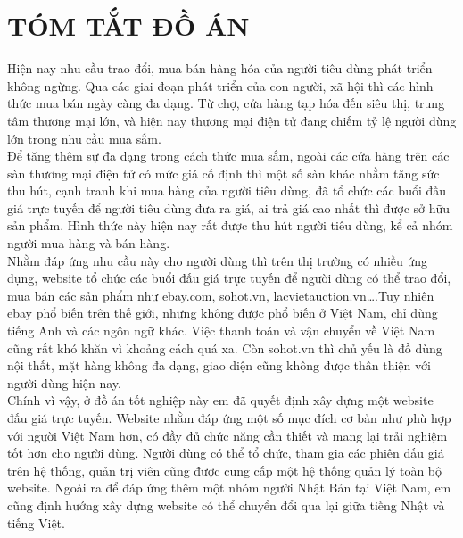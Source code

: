 \documentclass{article}
\renewcommand{\figurename}{\fontsize{12pt}{0pt}\selectfont \bfseries Hình}
\begin{document}
\section*{TÓM TẮT ĐỒ ÁN}
\thispagestyle{empty}
Hiện nay nhu cầu trao đổi, mua bán hàng hóa của người tiêu dùng phát triển không ngừng. Qua các giai đoạn phát triển của con người, xã hội thì các hình thức mua bán ngày càng đa dạng. Từ chợ, cửa hàng tạp hóa đến siêu thị, trung tâm thương mại lớn, và hiện nay thương mại điện tử đang chiếm tỷ lệ người dùng lớn trong nhu cầu mua sắm. \\
Để tăng thêm sự đa dạng trong cách thức mua sắm, ngoài các cửa hàng trên các sàn thương mại điện tử có mức giá cố định thì một số sàn khác nhằm tăng sức thu hút, cạnh tranh khi mua hàng của người tiêu dùng, đã tổ chức các buổi đấu giá trực tuyến để người tiêu dùng đưa ra giá, ai trả giá cao nhất thì được sở hữu sản phẩm. Hình thức này hiện nay rất được thu hút người tiêu dùng, kể cả nhóm người mua hàng và bán hàng.\\
Nhằm đáp ứng nhu cầu này cho người dùng thì trên thị trường có nhiều ứng dụng, website tổ chức các buổi đấu giá trực tuyến để người dùng có thể trao đổi, mua bán các sản phẩm như ebay.com, sohot.vn, lacvietauction.vn….Tuy nhiên ebay phổ biến trên thế giới, nhưng không được phổ biến ở Việt Nam, chỉ dùng tiếng Anh và các ngôn ngữ khác. Việc thanh toán và vận chuyển về Việt Nam cũng rất khó khăn vì khoảng cách quá xa. Còn sohot.vn thì chủ yếu là đồ dùng nội thất, mặt hàng không đa dạng, giao diện cũng không được thân thiện với người dùng hiện nay.\\ 
Chính vì vậy, ở đồ án tốt nghiệp này em đã quyết định xây dựng một website đấu giá trực tuyến. Website nhằm đáp ứng một số mục đích cơ bản như phù hợp với người Việt Nam hơn, có đầy đủ chức năng cần thiết và mang lại trải nghiệm tốt hơn cho người dùng. Người dùng có thể tổ chức, tham gia các phiên đấu giá trên hệ thống, quản trị viên cũng được cung cấp một hệ thống quản lý toàn bộ website. Ngoài ra để đáp ứng thêm một nhóm người Nhật Bản tại Việt Nam, em cũng định hướng xây dựng website có thể chuyển đổi  qua lại giữa tiếng Nhật và tiếng Việt.
\cleardoublepage

\tableofcontents %
\thispagestyle{empty}
\cleardoublepage


{%
\let\oldnumberline\numberline%
\renewcommand{\numberline}{\figurename~\oldnumberline}%
\listoffigures%
} %
\cleardoublepage
\end{document}
